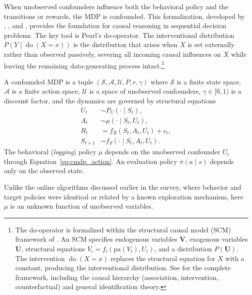 When unobserved confounders influence both the behavioral policy and the transitions or rewards, the MDP is confounded. This formalization, developed by \citet{zhang2019near}, \citet{zhang2020causal}, and \citet{kallus2020confounding}, provides the foundation for causal reasoning in sequential decision problems. The key tool is Pearl's do-operator. The interventional distribution $P(Y \mid \operatorname{do}(X = x))$ is the distribution that arises when $X$ is set externally rather than observed passively, severing all incoming causal influences on $X$ while leaving the remaining data-generating process intact.\footnote{The do-operator is formalized within the structural causal model (SCM) framework of \citet{pearl2009causality}. An SCM specifies endogenous variables $\mathbf{V}$, exogenous variables $\mathbf{U}$, structural equations $V_i = f_i(\text{pa}(V_i), U_i)$, and a distribution $P(\mathbf{U})$. The intervention $\operatorname{do}(X = x)$ replaces the structural equation for $X$ with a constant, producing the interventional distribution. See \citet{pearl2009causality} for the complete framework, including the causal hierarchy (association, intervention, counterfactual) and general identification theory.}

\begin{definition}
\label{def:confounded_mdp}
A confounded MDP is a tuple $(\mathcal{S}, \mathcal{A}, \mathcal{U}, P, r, \gamma)$ where $\mathcal{S}$ is a finite state space, $\mathcal{A}$ is a finite action space, $\mathcal{U}$ is a space of unobserved confounders, $\gamma \in [0,1)$ is a discount factor, and the dynamics are governed by structural equations
\begin{align}
U_t &\sim P_U(\cdot \mid S_t), \label{eq:cmdp_confounder} \\
A_t &\sim \mu(\cdot \mid S_t, U_t), \label{eq:cmdp_action} \\
R_t &= f_R(S_t, A_t, U_t) + \epsilon_t, \label{eq:cmdp_reward} \\
S_{t+1} &\sim f_S(\cdot \mid S_t, A_t, U_t). \label{eq:cmdp_transition}
\end{align}
The behavioral (\textit{logging}) policy $\mu$ depends on the unobserved confounder $U_t$ through Equation~\eqref{eq:cmdp_action}. An evaluation policy $\pi(a \mid s)$ depends only on the observed state.
\end{definition}

Unlike the online algorithms discussed earlier in the survey, where behavior and target policies were identical or related by a known exploration mechanism, here $\mu$ is an unknown function of unobserved variables.

